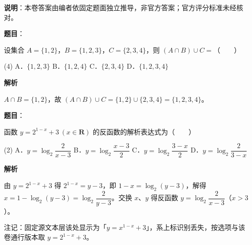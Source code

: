
\textbf{说明}：本卷答案由编者依固定题面独立推导，非官方答案；官方评分标准未经核对。

\begin{answer}

\textbf{题目}：

设集合 $A = \{1, 2\}$，$B = \{1, 2, 3\}$，$C = \{2, 3, 4\}$，则 $(A \cap B) \cup C =$\mbox{（　　）}

\begin{gkopts}(4)
\task A．$\{1, 2, 3\}$
\task B．$\{1, 2, 4\}$
\task C．$\{2, 3, 4\}$
\task D．$\{1, 2, 3, 4\}$
\end{gkopts}

\textbf{解析}

$A \cap B = \{1, 2\}$，故 $(A \cap B) \cup C = \{1, 2\} \cup \{2, 3, 4\} = \{1, 2, 3, 4\}$。


\end{answer}
\begin{answer}

\textbf{题目}：

函数 $y = 2^{1-x} + 3\ (x \in \mathbf{R})$ 的反函数的解析表达式为\mbox{（　　）}

\begin{gkopts}(2)
\task A．$y = \log_2 \dfrac{2}{x-3}$
\task B．$y = \log_2 \dfrac{x-3}{2}$
\task C．$y = \log_2 \dfrac{3-x}{2}$
\task D．$y = \log_2 \dfrac{2}{3-x}$
\end{gkopts}

\textbf{解析}

由 $y = 2^{1-x} + 3$ 得 $2^{1-x} = y - 3$，即 $1 - x = \log_2(y-3)$，解得 $x = 1 - \log_2(y-3) = \log_2\dfrac{2}{y-3}$。交换 $x$、$y$ 得反函数 $y = \log_2\dfrac{2}{x-3}$（$x > 3$）。

注记：固定源文本层该处显示为「$y = x^{1-x} + 3$」，系上标识别丢失，按选项与该卷通行版本取 $y = 2^{1-x} + 3$。


\end{answer}
